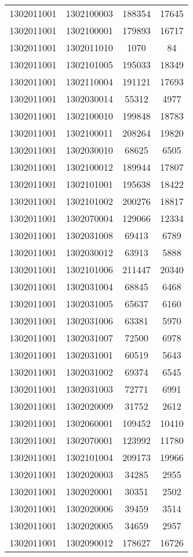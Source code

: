 \begin{longtable}[h]{llcc}
		1302011001 & 1302100003 & 188354 & 17645\\
		1302011001 & 1302100001 & 179893 & 16717\\
		1302011001 & 1302011010 & 1070 & 84\\
		1302011001 & 1302101005 & 195033 & 18349\\
		1302011001 & 1302110004 & 191121 & 17693\\
		1302011001 & 1302030014 & 55312 & 4977\\
		1302011001 & 1302100010 & 199848 & 18783\\
		1302011001 & 1302100011 & 208264 & 19820\\
		1302011001 & 1302030010 & 68625 & 6505\\
		1302011001 & 1302100012 & 189944 & 17807\\
		1302011001 & 1302101001 & 195638 & 18422\\
		1302011001 & 1302101002 & 200276 & 18817\\
		1302011001 & 1302070004 & 129066 & 12334\\
		1302011001 & 1302031008 & 69413 & 6789\\
		1302011001 & 1302030012 & 63913 & 5888\\
		1302011001 & 1302101006 & 211447 & 20340\\
		1302011001 & 1302031004 & 68845 & 6468\\
		1302011001 & 1302031005 & 65637 & 6160\\
		1302011001 & 1302031006 & 63381 & 5970\\
		1302011001 & 1302031007 & 72500 & 6978\\
		1302011001 & 1302031001 & 60519 & 5643\\
		1302011001 & 1302031002 & 69374 & 6545\\
		1302011001 & 1302031003 & 72771 & 6991\\
		1302011001 & 1302020009 & 31752 & 2612\\
		1302011001 & 1302060001 & 109452 & 10410\\
		1302011001 & 1302070001 & 123992 & 11780\\
		1302011001 & 1302101004 & 209173 & 19966\\
		1302011001 & 1302020003 & 34285 & 2955\\
		1302011001 & 1302020001 & 30351 & 2502\\
		1302011001 & 1302020006 & 39459 & 3514\\
		1302011001 & 1302020005 & 34659 & 2957\\
		1302011001 & 1302090012 & 178627 & 16726\\

\end{longtable}
